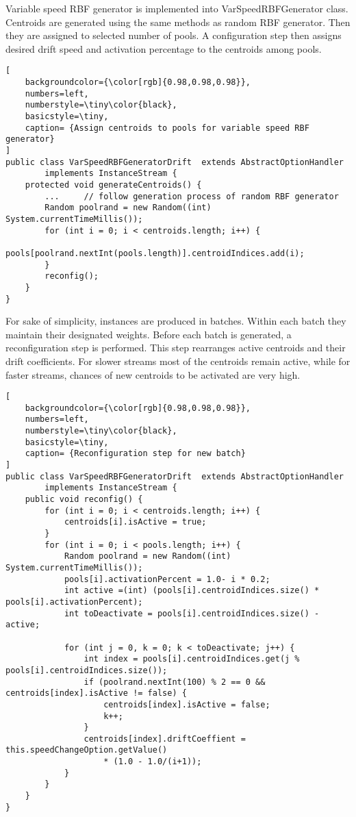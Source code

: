 Variable speed RBF generator is implemented into VarSpeedRBFGenerator class. Centroids are generated using the same methods as random RBF generator. Then they are assigned to selected number of pools. A configuration step then assigns desired drift speed and activation percentage to the centroids among pools.
\begin{lstlisting}[
    backgroundcolor={\color[rgb]{0.98,0.98,0.98}},
    numbers=left,
    numberstyle=\tiny\color{black},
    basicstyle=\tiny,
    caption= {Assign centroids to pools for variable speed RBF generator}
]
public class VarSpeedRBFGeneratorDrift  extends AbstractOptionHandler 
        implements InstanceStream {
    protected void generateCentroids() {
        ...		// follow generation process of random RBF generator
        Random poolrand = new Random((int) System.currentTimeMillis());
        for (int i = 0; i < centroids.length; i++) {
            pools[poolrand.nextInt(pools.length)].centroidIndices.add(i);
        }
        reconfig();
    }
}
\end{lstlisting}
For sake of simplicity, instances are produced in batches. Within each batch they maintain their designated weights. Before each batch is generated, a reconfiguration step is performed. This step rearranges active centroids and their drift coefficients. For slower streams most of the centroids remain active, while for faster streams, chances of new centroids to be activated are very high.
\begin{lstlisting}[
    backgroundcolor={\color[rgb]{0.98,0.98,0.98}},
    numbers=left,
    numberstyle=\tiny\color{black},
    basicstyle=\tiny,
    caption= {Reconfiguration step for new batch}
]
public class VarSpeedRBFGeneratorDrift  extends AbstractOptionHandler 
        implements InstanceStream {
    public void reconfig() {
        for (int i = 0; i < centroids.length; i++) {
            centroids[i].isActive = true;
        }
        for (int i = 0; i < pools.length; i++) {
            Random poolrand = new Random((int) System.currentTimeMillis());
            pools[i].activationPercent = 1.0- i * 0.2;
            int active =(int) (pools[i].centroidIndices.size() * pools[i].activationPercent);
            int toDeactivate = pools[i].centroidIndices.size() - active;
            
            for (int j = 0, k = 0; k < toDeactivate; j++) {
                int index = pools[i].centroidIndices.get(j % pools[i].centroidIndices.size());
                if (poolrand.nextInt(100) % 2 == 0 && centroids[index].isActive != false) { 
                    centroids[index].isActive = false;
                    k++;
                }
                centroids[index].driftCoeffient = this.speedChangeOption.getValue() 
                    * (1.0 - 1.0/(i+1));
            }
        }
    }
}
\end{lstlisting}

